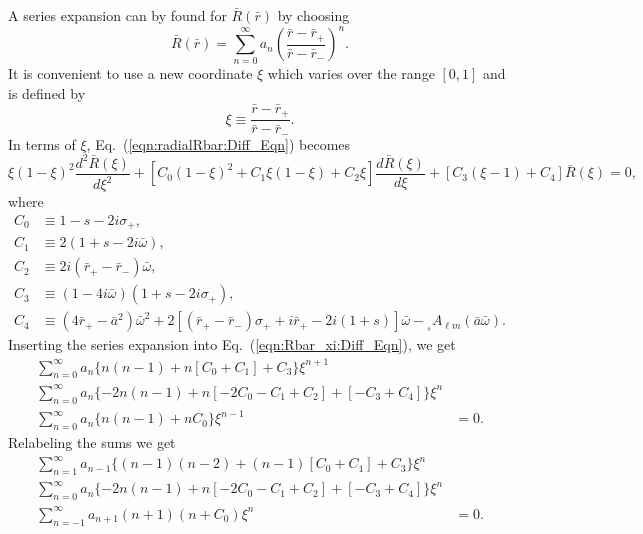 \documentclass[11pt]{article}
\newcommand{\scA}[4][]{{}_{{}_{#2}}A^{#1}_{#3}(#4)}
\begin{document}
A series expansion can by found for $\bar{R}(\bar{r})$ by choosing
\begin{equation}
  \bar{R}(\bar{r}) = \sum_{n=0}^\infty{a_n\left(
       \frac{\bar{r}-\bar{r}_+}{\bar{r}-\bar{r}_\minus}\right)^n}.
\end{equation}
It is convenient to use a new coordinate $\xi$ which varies over the
range $[0,1]$ and is defined by
\begin{equation}
  \xi \equiv \frac{\bar{r}-\bar{r}_+}{\bar{r}-\bar{r}_\minus}.
\end{equation}
In terms of $\xi$, Eq.~(\ref{eqn:radialRbar:Diff_Eqn}) becomes
\begin{equation}\label{eqn:Rbar_xi:Diff_Eqn}
  \xi(1-\xi)^2\frac{d^2\bar{R}(\xi)}{d\xi^2}
  + [C_0(1-\xi)^2 + C_1\xi(1-\xi) + C_2\xi]
            \frac{d\bar{R}(\xi)}{d\xi}
  + [C_3(\xi-1) + C_4]\bar{R}(\xi) = 0,
\end{equation}
where
\begin{align}
  C_0 &\equiv 1-s-2i\sigma_+, \\
  C_1 &\equiv 2(1+s-2i\bar\omega), \\
  C_2 &\equiv 2i(\bar{r}_+-\bar{r}_\minus)\bar\omega, \\
  C_3 &\equiv (1-4i\bar\omega)(1+s-2i\sigma_+), \\
  C_4 &\equiv (4\bar{r}_+-\bar{a}^2)\bar\omega^2
              + 2[(\bar{r}_+-\bar{r}_\minus)\sigma_+ + i\bar{r}_+ 
                  - 2i(1+s)]\bar\omega - \scA{s}{\ell{m}}{\bar{a}\bar\omega}.
\end{align}
Inserting the series expansion into Eq.~(\ref{eqn:Rbar_xi:Diff_Eqn}), we get
\begin{equation}
\begin{aligned}
  \sum_{n=0}^\infty{a_n\{n(n-1) + n[C_0+C_1] + C_3\}}\xi^{n+1} & \\
  \sum_{n=0}^\infty{a_n\{-2n(n-1) + n[-2C_0-C_1+C_2] + [-C_3+C_4]\}}\xi^n & \\
  \sum_{n=0}^\infty{a_n\{n(n-1) + nC_0\}}\xi^{n-1} &=0.
\end{aligned}
\end{equation}
Relabeling the sums we get
\begin{equation}
\begin{aligned}
  \sum_{n=1}^\infty{a_{n-1}\{(n-1)(n-2) + (n-1)[C_0+C_1] + C_3\}}\xi^n & \\
  \sum_{n=0}^\infty{a_n\{-2n(n-1) + n[-2C_0-C_1+C_2] + [-C_3+C_4]\}}\xi^n & \\
  \sum_{n=-1}^\infty{a_{n+1}(n+1)(n+C_0)}\xi^n &=0.
\end{aligned}
\end{equation}
\end{document}
